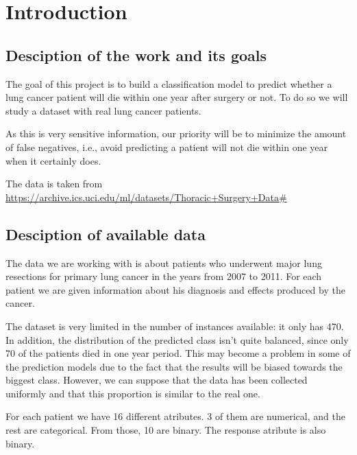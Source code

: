 \section{Introduction}

\subsection{Desciption of the work and its goals}

The goal of this project is to build a classification model to predict whether
a lung cancer patient will die within one year after surgery or not. To do so
we will study a dataset with real lung cancer patients.

As this is very sensitive information, our priority will be to minimize the
amount of false negatives, i.e., avoid predicting a patient will not die within
one year when it certainly does.


The data is taken from
\url{https://archive.ics.uci.edu/ml/datasets/Thoracic+Surgery+Data#}
\cite{zieba2013boosted}

\subsection{Desciption of available data}

The data we are working with is about patients who underwent major lung
resections for primary lung cancer in the years from 2007 to 2011. For each
patient we are given information about his diagnosis and effects produced
by the cancer.

The dataset is very limited in the number of instances available: it only has
470. In addition, the distribution of the predicted class isn't quite balanced,
since only 70 of the patients died in one year period. This may become a problem
in some of the prediction models due to the fact that the results will be biased
towards the biggest class. However, we can suppose that the data has been
collected uniformly and that this proportion is similar to the real one.

For each patient we have 16 different atributes. 3 of them are numerical, and
the rest are categorical. From those, 10 are binary. The response atribute is
also binary.
